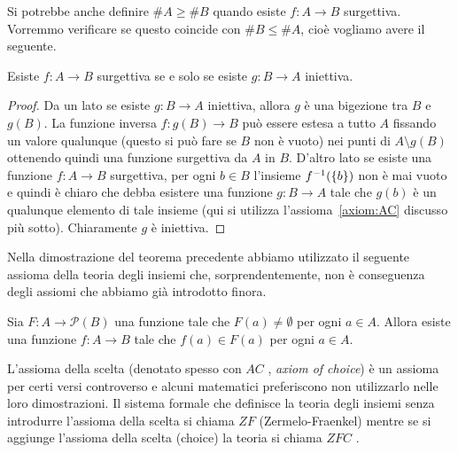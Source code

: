 Si potrebbe anche definire $\#A \ge \#B$ quando esiste $f\colon A \to B$
surgettiva. Vorremmo verificare se questo coincide con $\#B \le \#A$, 
cioè vogliamo avere il seguente.
%
\begin{theorem}\label{th:95444}
  Esiste $f\colon A\to B$ surgettiva 
  se e solo se esiste $g\colon B\to A$ iniettiva.
\end{theorem}
% 
\begin{proof}
Da un lato se esiste $g\colon B\to A$ iniettiva, allora $g$ è una bigezione 
tra $B$ e $g(B)$. La funzione inversa $f\colon g(B) \to B$ 
può essere estesa a tutto $A$ fissando un valore qualunque 
(questo si può fare se $B$ non è vuoto) nei punti di $A\setminus g(B)$
ottenendo quindi una funzione surgettiva da $A$ in $B$.
D'altro lato se esiste una funzione $f\colon A\to B$ surgettiva,
per ogni $b\in B$ l'insieme $f^{-1}({\left\{ b \right\}})$ non è mai 
vuoto e quindi è chiaro che debba esistere 
una funzione $g\colon B\to A$ tale che $g(b)$ è un qualunque elemento 
di tale insieme
(qui si utilizza l'assioma~\ref{axiom:AC} discusso più sotto). 
Chiaramente $g$ è iniettiva.
\end{proof}

Nella dimostrazione del teorema precedente abbiamo utilizzato il seguente assioma 
della teoria degli insiemi che, sorprendentemente, non è conseguenza degli assiomi 
che abbiamo già introdotto finora.

\begin{axiom}%
  \label{axiom:AC}%
  Sia $F\colon A \to \mathcal P(B)$
  una funzione tale che $F(a)\neq \emptyset$ 
  per ogni $a\in A$. Allora esiste una funzione
  $f\colon A \to B$ tale che $f(a)\in F(a)$
  per ogni $a\in A$.
\end{axiom}

L'assioma della scelta (denotato spesso con \emph{$AC$}%
%
, \emph{axiom of choice})
è un assioma per certi versi controverso
e alcuni matematici preferiscono non utilizzarlo nelle loro dimostrazioni.
Il sistema formale che definisce la teoria degli insiemi senza 
introdurre l'assioma della scelta 
si chiama \emph{$ZF$}%
%
 (Zermelo-Fraenkel) mentre 
se si aggiunge l'assioma della scelta (choice) la teoria si chiama 
\emph{$ZFC$}%
%
.

